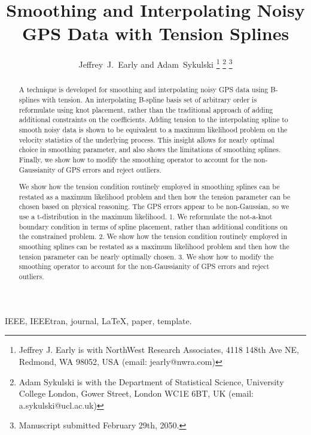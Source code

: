 \documentclass[10pt,journal]{IEEEtran}
\begin{document}
\title{Smoothing and Interpolating Noisy GPS Data with Tension Splines}

\author{Jeffrey~J.~Early and Adam~Sykulski%
\thanks{Jeffrey J. Early is with NorthWest Research Associates, 4118 148th Ave NE, Redmond, WA 98052, USA (email: jearly@nwra.com) } %
\thanks{Adam Sykulski is with the Department of Statistical Science, University College London, Gower Street, London WC1E 6BT, UK (email: a.sykulski@ucl.ac.uk)}%
\thanks{Manuscript submitted February 29th, 2050.} }



\maketitle

\begin{abstract}
A technique is developed for smoothing and interpolating noisy GPS data using B-splines with tension. An interpolating B-spline basis set of arbitrary order is reformulate using knot placement, rather than the traditional approach of adding additional constraints on the coefficients. Adding tension to the interpolating spline to smooth noisy data is shown to be equivalent to a maximum likelihood problem on the velocity statistics of the underlying process. This insight allows for nearly optimal choice in smoothing parameter, and also shows the limitations of smoothing splines. Finally, we show how to modify the smoothing operator to account for the non-Gaussianity of GPS errors and reject outliers.


We show how the tension condition routinely employed in smoothing splines can be restated as a maximum likelihood problem and then how the tension parameter can be chosen based on physical reasoning. The GPS errors appear to be non-Gaussian, so we use a t-distribution in the maximum likelihood.
1. We reformulate the not-a-knot boundary condition in terms of spline placement, rather than additional conditions on the constrained problem.
2. We show how the tension condition routinely employed in smoothing splines can be restated as a maximum likelihood problem and then how the tension parameter can be nearly optimally chosen.
3. We show how to modify the smoothing operator to account for the non-Gaussianity of GPS errors and reject outliers.

\end{abstract}

\begin{IEEEkeywords}
IEEE, IEEEtran, journal, \LaTeX, paper, template.
\end{IEEEkeywords}
\end{document}
